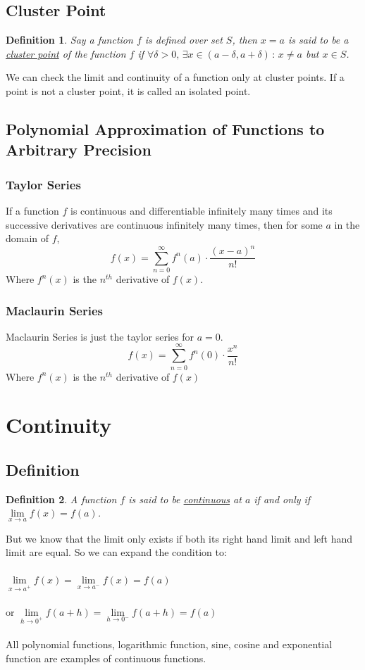 \documentclass[14]{article}
\newtheorem{define}{Definition}
\theoremstyle{definition}
\theoremstyle{case}
\begin{document}
\subsection{Cluster Point}
\begin{define}
Say a function $f$ is defined over set $S$, then $x = a$ is said to be a \underline{cluster point} of the function $f$ if $\forall \delta > 0,\, \exists x \in (a - \delta, a + \delta)\, : \, x \neq a$ but $x \in S$.
\end{define}
We can check the limit and continuity of a function only at cluster points. If a point is not a cluster point, it is called an isolated point.
\subsection{Polynomial Approximation of Functions to Arbitrary Precision}
\subsubsection{Taylor Series}
If a function $f$ is continuous and differentiable infinitely many times and its successive derivatives are continuous infinitely many times, then for some $a$ in the domain of $f$,\\
\[f(x) = \sum\limits_{n=0}^{\infty} f^n(a) \cdot \dfrac{{(x-a)^n}}{n!}\]
Where $f^n(x)$ is the $n^{th}$ derivative of $f(x)$.
\subsubsection{Maclaurin Series}
Maclaurin Series is just the taylor series for $a = 0$.\\
\[f(x) = \sum\limits_{n=0}^{\infty} f^n(0) \cdot \dfrac{x^n}{n!}\]
Where $f^n(x)$ is the $n^{th}$ derivative of $f(x)$
\pagebreak
\section{Continuity}
\subsection{Definition}
\begin{define}
A function $f$ is said to be \underline{continuous} at $a$ if and only if $\lim\limits_{x \to a} f(x) = f(a)$.
\end{define}
But we know that the limit only exists if both its right hand limit and left hand limit are equal.
So we can expand the condition to:\\\\
$\lim\limits_{x \to a^+} f(x) = \lim\limits_{x \to a^-} f(x) = f(a)$\\\\
or $\lim\limits_{h \to 0^+} f(a+h) = \lim\limits_{h \to 0^-} f(a+h) = f(a)$\\\\
All polynomial functions, logarithmic function, sine, cosine and exponential function are examples of continuous functions.
\end{document}
